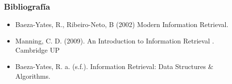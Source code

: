 \documentclass[
	10pt, %
	aspectratio=169, %
]{beamer}
\begin{document}

\begin{frame}
	
	\frametitle{Bibliografía}
	
	\begin{itemize}
		\item Baeza-Yates, R., Ribeiro-Neto, B (2002) Modern Information Retrieval.
		
		\item Manning, C. D. (2009). An Introduction to Information Retrieval . Cambridge UP
		
		\item Baeza-Yates, R. a. (s.f.). Information Retrieval: Data Structures \& Algorithms. 
	\end{itemize}
	
\end{frame}


\begin{frame}
	\titlepage
\end{frame}
\end{document}
